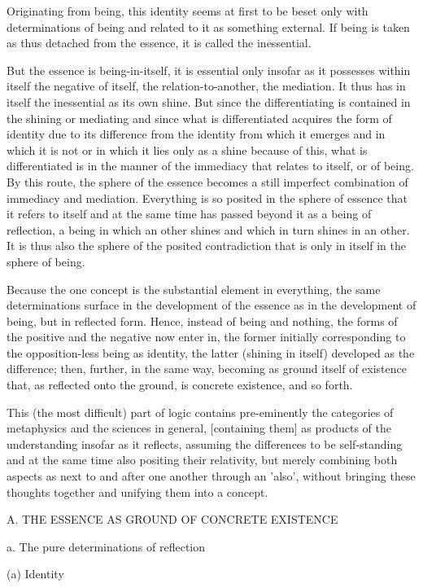 Originating from being, this identity seems at first
to be beset only with determinations of being
and related to it as something external.
If being is taken as thus detached from the essence,
it is called the inessential.

But the essence is being-in-itself, it is essential only insofar as
it possesses within itself the negative of itself,
the relation-to-another, the mediation.
It thus has in itself the inessential as its own shine.
But since the differentiating is contained in the shining or mediating
and since what is differentiated acquires the form of identity due to
its difference from the identity from which it emerges and in which it is not
or in which it lies only as a shine because of this,
what is differentiated is in the manner of
the immediacy that relates to itself, or of being.
By this route, the sphere of the essence becomes a
still imperfect combination of immediacy and mediation.
Everything is so posited in the sphere of essence
that it refers to itself and at the same time
has passed beyond it as a being of reflection,
a being in which an other shines and which in turn shines in an other.
It is thus also the sphere of the posited contradiction
that is only in itself in the sphere of being.

Because the one concept is the substantial element in everything,
the same determinations surface in the development of the essence
as in the development of being, but in reflected form.
Hence, instead of being and nothing,
the forms of the positive and the negative now enter in,
the former initially corresponding to
the opposition-less being as identity,
the latter (shining in itself) developed as the difference;
then, further, in the same way,
becoming as ground itself of existence that,
as reflected onto the ground, is concrete existence,
and so forth.

This (the most difficult) part of logic contains pre-eminently
the categories of metaphysics and the sciences in general,
[containing them] as products of the understanding insofar as it reflects,
assuming the differences to be self-standing and
at the same time also positing their relativity,
but merely combining both aspects as next to
and after one another through an 'also',
without bringing these thoughts together
and unifying them into a concept.

A. THE ESSENCE AS GROUND OF CONCRETE EXISTENCE

a. The pure determinations of reflection

(a) Identity


